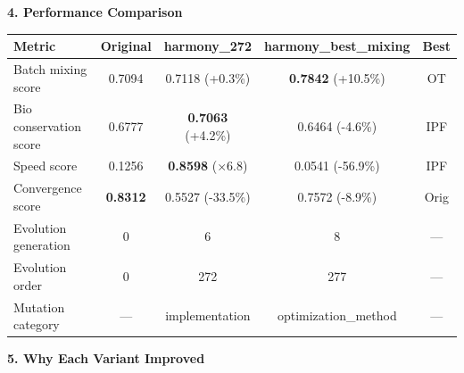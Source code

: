 \documentclass[8pt]{article}
\begin{document}
\vspace{6pt}

{\large\bfseries 4. Performance Comparison}

\vspace{3pt}

\renewcommand{\arraystretch}{1.25}
\begin{table}[ht]
\centering
\small
\begin{tabular}{@{}l c c c c@{}}
\toprule
\textbf{Metric} & \textbf{Original} & \textbf{harmony\_272} & \textbf{harmony\_best\_mixing} & \textbf{Best} \\
\midrule
Batch mixing score & 0.7094 & 0.7118 {\scriptsize (+0.3\%)} & \textbf{0.7842} {\scriptsize (+10.5\%)} & OT \\
Bio conservation score & 0.6777 & \textbf{0.7063} {\scriptsize (+4.2\%)} & 0.6464 {\scriptsize (-4.6\%)} & IPF \\
Speed score & 0.1256 & \textbf{0.8598} {\scriptsize ($\times$6.8)} & 0.0541 {\scriptsize (-56.9\%)} & IPF \\
Convergence score & \textbf{0.8312} & 0.5527 {\scriptsize (-33.5\%)} & 0.7572 {\scriptsize (-8.9\%)} & Orig \\
\addlinespace
Evolution generation & 0 & 6 & 8 & --- \\
Evolution order & 0 & 272 & 277 & --- \\
Mutation category & --- & implementation & optimization\_method & --- \\
\bottomrule
\end{tabular}
\end{table}

\vspace{6pt}

{\large\bfseries 5. Why Each Variant Improved}

\vspace{3pt}
\end{document}
